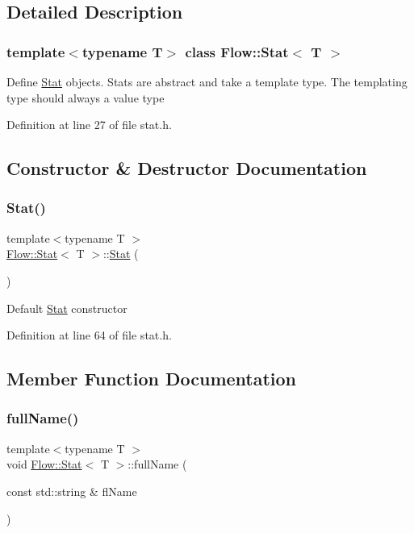 \subsection{Detailed Description}
\subsubsection*{template$<$typename T$>$\newline
class Flow\+::\+Stat$<$ T $>$}

Define \hyperlink{class_flow_1_1_stat}{Stat} objects. Stats are abstract and take a template type. The templating type should always a value type 

Definition at line 27 of file stat.\+h.



\subsection{Constructor \& Destructor Documentation}
\hypertarget{class_flow_1_1_stat_ab9619eea9fbadcdc6c16eb371344d6d9}{}\label{class_flow_1_1_stat_ab9619eea9fbadcdc6c16eb371344d6d9} 
\subsubsection{\texorpdfstring{Stat()}{Stat()}}
{\footnotesize\ttfamily template$<$typename T $>$ \\
\hyperlink{class_flow_1_1_stat}{Flow\+::\+Stat}$<$ T $>$\+::\hyperlink{class_flow_1_1_stat}{Stat} (\begin{DoxyParamCaption}{ }\end{DoxyParamCaption})}

Default \hyperlink{class_flow_1_1_stat}{Stat} constructor 

Definition at line 64 of file stat.\+h.



\subsection{Member Function Documentation}
\hypertarget{class_flow_1_1_stat_a1a04573bbc533a2d5af98ec708a060ca}{}\label{class_flow_1_1_stat_a1a04573bbc533a2d5af98ec708a060ca} 
\subsubsection{\texorpdfstring{full\+Name()}{fullName()}\hspace{0.1cm}{\footnotesize\ttfamily [1/2]}}
{\footnotesize\ttfamily template$<$typename T $>$ \\
void \hyperlink{class_flow_1_1_stat}{Flow\+::\+Stat}$<$ T $>$\+::full\+Name (\begin{DoxyParamCaption}\item[{const std\+::string \&}]{fl\+Name }\end{DoxyParamCaption})}

